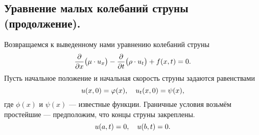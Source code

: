 	\chapter{}
\label{lecture12}
\section{Уравнение малых колебаний струны (продолжение).}
\label{lecture12section1}
Возвращаемся к выведенному нами уравнению колебаний струны
\begin{equation}
	\label{l12:eq:1}
	\hfill\pder{}{x}\big(\mu\cdot u_x\big)-\pder{}{t}\big(\rho\cdot u_t\big)+f(x,t)=0.\hfill
\end{equation}
Пусть начальное положение и начальная скорость струны задаются равенствами 
\begin{equation}
	\label{l12:eq:2}
	\hfill u(x,0)=\phi(x),\quad u_t(x,0)=\psi(x),\hfill
\end{equation} 
где $\phi(x)$ и $\psi(x)$ --- известные функции. Граничные условия возьмём простейшие --- предположим, что концы струны закреплены.
\begin{equation}
	\label{l12:eq:3}
	\hfill u(a,t)=0,\quad u(b,t)=0.\hfill
\end{equation}

